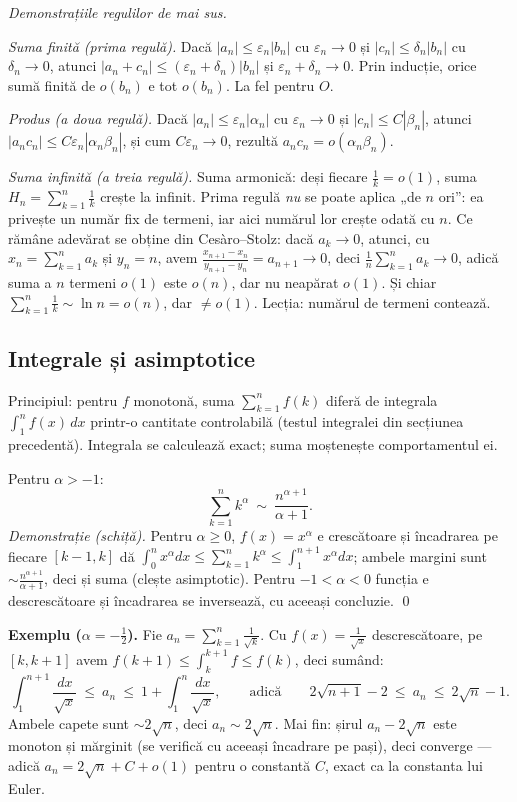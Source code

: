 \emph{Demonstrațiile regulilor de mai sus.}

\emph{Suma finită (prima regulă).} Dacă $|a_n|\le\varepsilon_n|b_n|$ cu $\varepsilon_n\to0$ și $|c_n|\le\delta_n|b_n|$ cu $\delta_n\to0$, atunci $|a_n+c_n|\le(\varepsilon_n+\delta_n)|b_n|$ și $\varepsilon_n+\delta_n\to0$. Prin inducție, orice sumă finită de $o(b_n)$ e tot $o(b_n)$. La fel pentru $O$.

\emph{Produs (a doua regulă).} Dacă $|a_n|\le\varepsilon_n|\alpha_n|$ cu $\varepsilon_n\to0$ și $|c_n|\le C|\beta_n|$, atunci $|a_nc_n|\le C\varepsilon_n|\alpha_n\beta_n|$, și cum $C\varepsilon_n\to0$, rezultă $a_nc_n=o(\alpha_n\beta_n)$.

\emph{Suma infinită (a treia regulă).} Suma armonică: deși fiecare $\frac1k=o(1)$, suma $H_n=\sum_{k=1}^n\frac1k$ crește la infinit. Prima regulă \emph{nu} se poate aplica „de $n$ ori'': ea privește un număr fix de termeni, iar aici numărul lor crește odată cu $n$. Ce rămâne adevărat se obține din Cesàro--Stolz: dacă $a_k\to0$, atunci, cu $x_n=\sum_{k=1}^n a_k$ și $y_n=n$, avem $\frac{x_{n+1}-x_n}{y_{n+1}-y_n}=a_{n+1}\to0$, deci $\frac1n\sum_{k=1}^n a_k\to0$, adică suma a $n$ termeni $o(1)$ este $o(n)$, dar nu neapărat $o(1)$. Și chiar $\sum_{k=1}^n\frac1k\sim\ln n=o(n)$, dar $\not=o(1)$. Lecția: numărul de termeni contează.

\subsection{Integrale și asimptotice}

Principiul: pentru $f$ monotonă, suma $\sum_{k=1}^n f(k)$ diferă de integrala $\int_1^n f(x)\,dx$ printr-o cantitate controlabilă (testul integralei din secțiunea precedentă). Integrala se calculează exact; suma moștenește comportamentul ei.

\begin{teorema}
Pentru $\alpha>-1$:
\[
\sum_{k=1}^{n}k^{\alpha}\ \sim\ \frac{n^{\alpha+1}}{\alpha+1}.
\]
\emph{Demonstrație (schiță).} Pentru $\alpha\ge0$, $f(x)=x^\alpha$ e crescătoare și încadrarea pe fiecare $[k-1,k]$ dă
$\int_0^{n}x^{\alpha}dx\le\sum_{k=1}^n k^{\alpha}\le\int_1^{n+1}x^{\alpha}dx$;
ambele margini sunt $\sim\frac{n^{\alpha+1}}{\alpha+1}$, deci și suma (clește asimptotic). Pentru $-1<\alpha<0$ funcția e descrescătoare și încadrarea se inversează, cu aceeași concluzie. \qed
\end{teorema}

\textbf{Exemplu ($\alpha=-\tfrac12$).} Fie $a_n=\sum_{k=1}^n\frac{1}{\sqrt k}$. Cu $f(x)=\frac1{\sqrt x}$ descrescătoare, pe $[k,k+1]$ avem $f(k+1)\le\int_k^{k+1}f\le f(k)$, deci sumând:
\[
\int_1^{n+1}\frac{dx}{\sqrt x}\ \le\ a_n\ \le\ 1+\int_1^{n}\frac{dx}{\sqrt x},
\qquad\text{adică}\qquad
2\sqrt{n+1}-2\ \le\ a_n\ \le\ 2\sqrt n-1.
\]
Ambele capete sunt $\sim2\sqrt n$, deci $\boxed{a_n\sim2\sqrt n}$. Mai fin: șirul $a_n-2\sqrt n$ este monoton și mărginit (se verifică cu aceeași încadrare pe pași), deci converge --- adică $a_n=2\sqrt n+C+o(1)$ pentru o constantă $C$, exact ca la constanta lui Euler.

